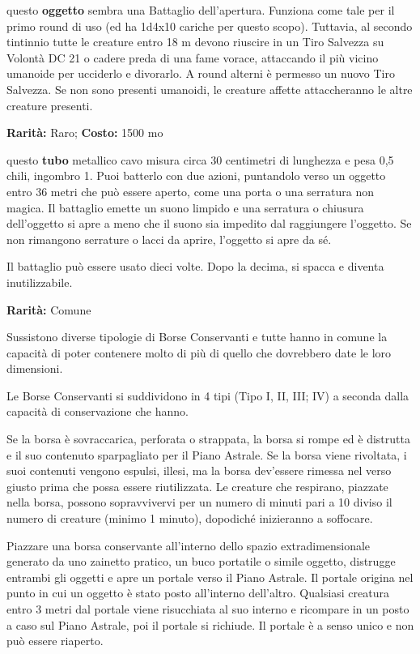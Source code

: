 \begin{multicols}{2}

questo \textbf{oggetto} sembra una Battaglio dell'apertura. Funziona come tale per il primo round di uso (ed ha 1d4x10 cariche per questo scopo). Tuttavia, al secondo tintinnio tutte le creature entro 18 m devono riuscire in un Tiro Salvezza su Volontà DC 21 o cadere preda di una fame vorace, attaccando il più vicino umanoide per ucciderlo e divorarlo. A round alterni è permesso un nuovo Tiro Salvezza. Se non sono presenti umanoidi, le creature affette attaccheranno le altre creature presenti.


\textbf{Rarità:} Raro; \textbf{Costo:} 1500 mo

questo \textbf{tubo} metallico cavo misura circa 30 centimetri di lunghezza e pesa 0,5 chili, ingombro 1. Puoi batterlo con due azioni, puntandolo verso un oggetto entro 36 metri che può essere aperto, come una porta o una serratura non magica. Il battaglio emette un suono limpido e una serratura o chiusura dell'oggetto si apre a meno che il suono sia impedito dal raggiungere l'oggetto. Se non rimangono serrature o lacci da aprire, l'oggetto si apre da sé.

Il battaglio può essere usato dieci volte. Dopo la decima, si spacca e diventa inutilizzabile.


\textbf{Rarità:} Comune

Sussistono diverse tipologie di Borse Conservanti e tutte hanno in comune la capacità di poter contenere molto di più di quello che dovrebbero date le loro dimensioni.

Le Borse Conservanti si suddividono in 4 tipi (Tipo I, II, III; IV) a seconda dalla capacità di conservazione che hanno.

Se la borsa è sovraccarica, perforata o strappata, la borsa si rompe ed è distrutta e il suo contenuto sparpagliato per il Piano Astrale. Se la borsa viene rivoltata, i suoi contenuti vengono espulsi, illesi, ma la borsa dev'essere rimessa nel verso giusto prima che possa essere riutilizzata. Le creature che respirano, piazzate nella borsa, possono sopravvivervi per un numero di minuti pari a 10 diviso il numero di creature (minimo 1 minuto), dopodiché inizieranno a soffocare.

Piazzare una borsa conservante all'interno dello spazio extradimensionale generato da uno zainetto pratico, un buco portatile o simile oggetto, distrugge entrambi gli oggetti e apre un portale verso il Piano Astrale. Il portale origina nel punto in cui un oggetto è stato posto all'interno dell'altro. Qualsiasi creatura entro 3 metri dal portale viene risucchiata al suo interno e ricompare in un posto a caso sul Piano Astrale, poi il portale si richiude. Il portale è a senso unico e non può essere riaperto.


\end{multicols}
